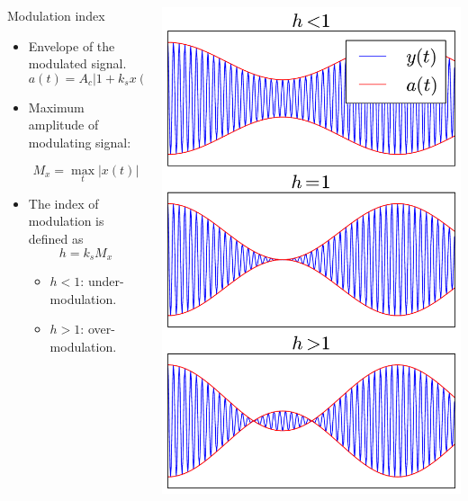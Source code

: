 \begin{columns}
  \begin{column}{6cm}

     \begin{block}{Modulation index}
       \begin{itemize}
       \item  Envelope of the modulated signal.
$$a(t)=A_c|1+k_sx(t)|$$
       \item Maximum amplitude of modulating signal:

$$M_x=\max_t|x(t)|$$
       \item The index of modulation is defined as 
$$h=k_sM_x$$
\vspace{-5mm}
\begin{itemize}
\item $h<1$: under-modulation.
\item $h>1$: over-modulation.
\end{itemize}

       \end{itemize}
 
\end{block}
\end{column}
  \begin{column}{4.5cm}
      \includegraphics[width=0.5\linewidth]{imgs/fourier/mod_ampl_h.pdf}

  \end{column}
\end{columns}

